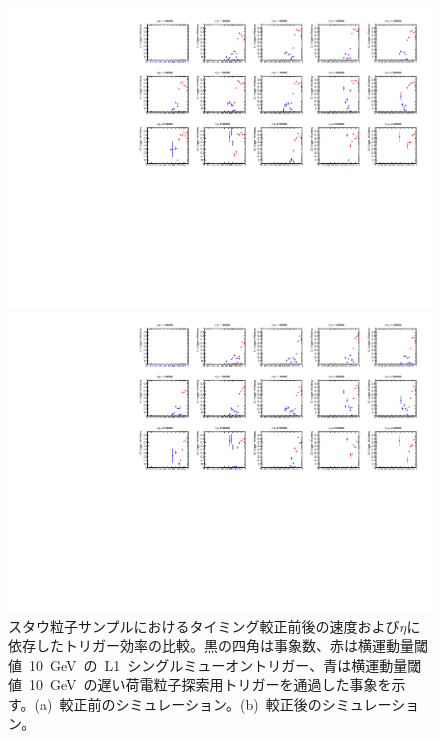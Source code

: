 \begin{figure}[tbp]
    \begin{minipage}{0.49\hsize}
    \centering   
    \includegraphics[width=\textwidth,page=16]{img/rec/stau_600_ori.pdf}
    \subcaption{}
    \end{minipage}
    \begin{minipage}{0.49\hsize}
    \centering   
    \includegraphics[width=\textwidth,page=16]{img/rec/stau_600.pdf}
    \subcaption{}
    \end{minipage}
    \caption[スタウ粒子サンプルにおけるタイミング較正前後の速度および$\eta$に依存したトリガー効率の比較]{スタウ粒子サンプルにおけるタイミング較正前後の速度および$\eta$に依存したトリガー効率の比較。黒の四角は事象数、赤は横運動量閾値~10~GeV~の~L1~シングルミューオントリガー、青は横運動量閾値~10~GeV~の遅い荷電粒子探索用トリガーを通過した事象を示す。(a)~較正前のシミュレーション。(b)~較正後のシミュレーション。}\label{fig:trietabeta}
\end{figure}

